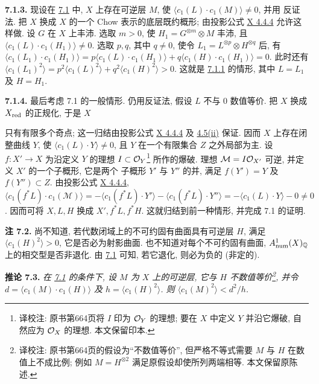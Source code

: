 \textbf{7.1.3.} 现设在 \hyperlink{sga6.e13.thm.7-1}{7.1} 中, $X$ 上存在可逆层 $M$,
使 $\langle c_1(L)\cdot c_1(M)\rangle\ne0$, 并用
反证法. 把 $X$ 换成 $X$ 的一个 Chow
表示的底层既约概形; 由投影公式 \hyperlink{sga6.e10.eq.4-4-4}{X
4.4.4} 允许这样做. 设 $G$ 在 $X$ 上丰沛. 选取 $m>0$, 使
$H_1=G^{\otimes m}\otimes M$ 丰沛, 且
$\langle c_1(L)\cdot c_1(H_1)\rangle\ne0$. 选取 $p,q$, 其中 $q\ne0$,
使令 $L_1=L^{\otimes p}\otimes H^{\otimes q}$ 后, 有
$\langle c_1(L_1)\cdot c_1(H_1)\rangle
=p\langle c_1(L)\cdot c_1(H_1)\rangle
+q\langle c_1(H)\cdot c_1(H_1)\rangle=0$. 此时还有
$\langle c_1(L_1)^2\rangle=p^2\langle c_1(L)^2\rangle
+q^2\langle c_1(H)^2\rangle>0$. 这就是 \hyperlink{sga6.e13.para.7-1-1}{7.1.1} 的情形, 其中 $L=L_1$
及 $H=H_1$.

\textbf{7.1.4.} 最后考虑 7.1 的一般情形. 仍用反证法, 假设 $L$ 不与 $0$ 数值等价. 把 $X$ 换成 $X_{\mathrm{red}}$ 的正规化, 于是 $X$

只有有限多个奇点; 这一归结由投影公式 \hyperlink{sga6.e10.eq.4-4-4}{X 4.4.4} 及 \hyperlink{sga6.e13.prop.4-5}{4.5(ii)} 保证. 因而 $X$ 上存在闭整曲线 $Y$, 使
$\langle c_1(L)\cdot Y\rangle\ne0$, 且 $Y$ 在一个有限集合 $Z$
之外局部为主. 设 $f:X'\to X$ 为沿定义 $Y$ 的理想
$I\subset\mathcal O_Y$\footnote{译校注: 原书第664页将 $I$ 印为 $\mathcal O_Y$ 的理想; 要在 $X$ 中定义 $Y$ 并沿它爆破, 自然应为 $\mathcal O_X$ 的理想. 本文保留印本.} 所作的爆破. 理想 $\mathcal M=I\mathcal O_{X'}$
可逆, 并定义 $X'$ 的一个子概形, 它是两个
子概形 $Y'$ 与 $Y''$ 的并, 满足 $f(Y')=Y$ 及 $f(Y'')\subset Z$.
由投影公式 \hyperlink{sga6.e10.eq.4-4-4}{X 4.4.4},
$\langle c_1(f^*L)\cdot c_1(\mathcal M)\rangle
=-\langle c_1(f^*L)\cdot Y'\rangle
-\langle c_1(f^*L)\cdot Y''\rangle
=-\langle c_1(L)\cdot Y\rangle-0\ne0$. 因而可将 $X,L,H$
换成 $X',f^*L,f^*H$. 这就归结到前一种情形,
并完成 7.1 的证明.

\textbf{注 7.2.} 尚不知道, 若代数闭域上的不可约固有曲面具有可逆层 $H$, 满足 $\langle c_1(H)^2\rangle>0$, 它是否必为射影曲面. 也不知道对每个不可约固有曲面, $A^1_{\mathrm{num}}(X)_{\mathbb Q}$ 上的相交型是否非退化. 由 \hyperlink{sga6.e13.thm.7-1}{7.1} 可知, 若它退化, 则必为负的 (非定的).

\textbf{推论 7.3.} \emph{在 \hyperlink{sga6.e13.thm.7-1}{7.1} 的条件下, 设 $M$ 为
$X$ 上的可逆层, 它与 $H$ 不数值等价\footnote{译校注: 原书第664页的假设为“不数值等价”, 但严格不等式需要 $M$ 与 $H$ 在数值上不成比例; 例如 $M=H^{\otimes2}$ 满足原假设却使所列两端相等. 本文保留原陈述.},
并令 $d=\langle c_1(M)\cdot c_1(H)\rangle$ 及
$h=\langle c_1(H)^2\rangle$. 则
$\langle c_1(M)^2\rangle<d^2/h$.}

